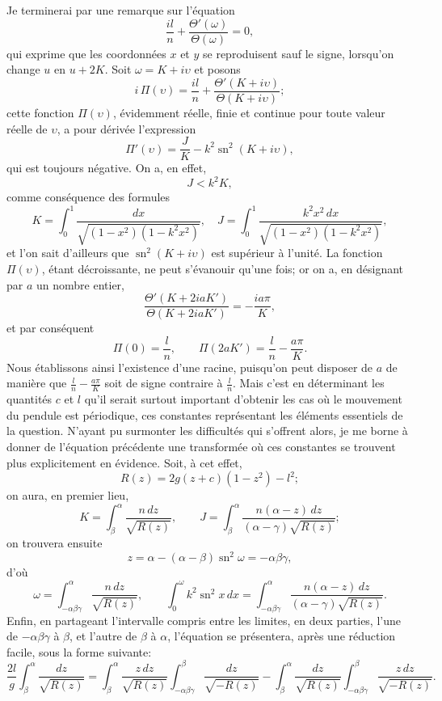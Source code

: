 \documentclass[11pt,leqno,oneside,letterpaper]{book}[2005/09/16]
\DeclareMathOperator{\sn}{sn}
\begin{document}
Je terminerai par une remarque sur l'\'equation
\[
  \frac{il}{n} + \frac{\Theta'(\omega)}{\Theta(\omega)} = 0,
\]
qui exprime que les coordonn\'ees $x$ et $y$ se reproduisent sauf le signe, lorsqu'on
change $u$ en $u + 2K$. Soit $\omega = K + i\upsilon$ et posons
\[
  i\,\Pi(\upsilon) = \frac{il}{n} + \frac{\Theta'(K+i\upsilon)}{\Theta(K+i\upsilon)};
\]
cette fonction $\Pi(\upsilon)$, \'evidemment r\'eelle, finie et continue pour toute valeur
r\'eelle de $\upsilon$, a pour d\'eriv\'ee l'expression
\[
  \Pi'(\upsilon) = \frac JK - k^2 \sn^2(K+i\upsilon),
\]
qui est toujours n\'egative. On a, en effet,
\[
  J < k^2 K,
\]
comme cons\'equence des formules
\[
  K = \int_0^1 \frac{        dx}{\sqrt{(1-x^2)(1-k^2x^2)}},  \quad
  J = \int_0^1 \frac{k^2x^2\,dx}{\sqrt{(1-x^2)(1-k^2x^2)}},
\]
et l'on sait d'ailleurs que $\sn^2(K + i\upsilon)$ est sup\'erieur \`a l'unit\'e. La fonction
$\Pi(\upsilon)$, \'etant d\'ecroissante, ne peut s'\'evanouir qu'une fois; or on a, en
d\'esignant par $a$ un nombre entier,
\[
  \frac{ \Theta'(K+2i aK') }{ \Theta(K+2i aK') } = -\frac{ia\pi}{K},
\]
et par cons\'equent
\[
\Pi(0) = \frac{l}{n},\qquad \Pi(2aK')=\frac{l}{n}-\frac{a\pi}{K}.
\]
Nous \'etablissons ainsi l'existence d'une racine, puisqu'on peut disposer
de $a$ de mani\`ere que $\frac{l}{n} - \frac{a\pi}{K}$ soit de signe contraire \`a $\frac{l}{n}$. Mais c'est en d\'eterminant
les quantit\'es $c$ et $l$ qu'il serait surtout important d'obtenir les
cas o\`u le mouvement du pendule est p\'eriodique, ces constantes repr\'esentant
les \'el\'ements essentiels de la question. N'ayant pu surmonter les
difficult\'es qui s'offrent alors, je me borne \`a donner de l'\'equation pr\'ec\'edente
une transform\'ee o\`u ces constantes se trouvent plus explicitement en
\'evidence. Soit, \`a cet effet,
\[
R(z) = 2g(z+c)(1-z^2)-l^2;
\]
on aura, en premier lieu,
\[
K = \int_{\beta}^{\alpha} \frac{n\,dz}{\sqrt{R(z)}},\qquad
J = \int_{\beta}^{\alpha} \frac{n(\alpha-z)\,dz}{(\alpha-\gamma)\sqrt{R(z)}};
\]
on trouvera ensuite
\[
z=\alpha - (\alpha-\beta)\sn^2\omega = -\alpha\beta\gamma,
\]
d'o\`u
\[
\omega=\int_{-\alpha\beta\gamma}^{\alpha} \frac{n\,dz}{\sqrt{R(z)}},
\qquad
\int_0^{\omega} k^2\sn^2 x\,dx =
\int_{-\alpha\beta\gamma}^{\alpha} \frac{n(\alpha-z)\,dz}{(\alpha-\gamma)\sqrt{R(z)}}.
\]
Enfin, en partageant l'intervalle compris entre les limites, en deux parties,
l'une de $-\alpha\beta\gamma$ \`a $\beta$, et l'autre de $\beta$ \`a $\alpha$, l'\'equation se pr\'esentera, apr\`es
une r\'eduction facile, sous la forme suivante:
\[
\frac{2l}{g} \int_{\beta}^{\alpha} \frac{dz}{\sqrt{R(z)}} =
  \int_{\beta}^{\alpha} \frac{z\,dz}{\sqrt{R(z)}}
  \int_{-\alpha\beta\gamma}^{\beta} \frac{dz}{\sqrt{-R(z)}} -
  \int_{\beta}^{\alpha} \frac{dz}{\sqrt{R(z)}}
  \int_{-\alpha\beta\gamma}^{\beta} \frac{z\,dz}{\sqrt{-R(z)}}.
\]
\end{document}
